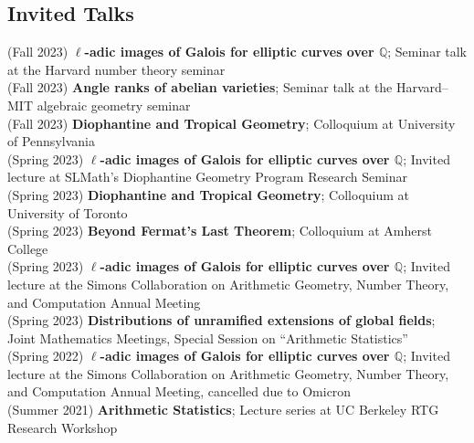 \documentclass[margin,line]{res}
\begin{document}
\begin{resume}
  \section{\sc Invited Talks}
(Fall 2023) \textbf{$\ell$-adic images of Galois for elliptic curves over $\mathbb{Q}$};
Seminar talk at the Harvard number theory seminar
\vspace{.05cm}\\  
(Fall 2023) \textbf{Angle ranks of abelian varieties};
Seminar talk at the Harvard--MIT algebraic geometry seminar
\vspace{.05cm}\\  
(Fall 2023) \textbf{Diophantine and Tropical Geometry};
Colloquium at University of Pennsylvania
\vspace{.05cm}\\  
(Spring 2023) \textbf{$\ell$-adic images of Galois for elliptic curves over $\mathbb{Q}$};
Invited lecture at SLMath's Diophantine Geometry Program Research Seminar
\vspace{.05cm}\\  
(Spring 2023) \textbf{Diophantine and Tropical Geometry};
Colloquium at University of Toronto
\vspace{.05cm}\\  
(Spring 2023) \textbf{Beyond Fermat's Last Theorem};
Colloquium at Amherst College
\vspace{.05cm}\\  
(Spring 2023) \textbf{$\ell$-adic images of Galois for elliptic curves over $\mathbb{Q}$};
Invited lecture at  the Simons Collaboration on Arithmetic Geometry, Number Theory, and Computation Annual Meeting
\vspace{.05cm}\\
(Spring 2023) \textbf{Distributions of unramified extensions of global fields};
Joint Mathematics Meetings, Special Session on ``Arithmetic Statistics''
\vspace{.05cm}\\
(Spring 2022) \textbf{$\ell$-adic images of Galois for elliptic curves over $\mathbb{Q}$};
Invited lecture at  the Simons Collaboration on Arithmetic Geometry, Number Theory, and Computation Annual Meeting, cancelled due to Omicron
\vspace{.05cm}\\
(Summer 2021) \textbf{Arithmetic Statistics};
Lecture series at UC Berkeley RTG Research Workshop

\end{resume}
\end{document}
